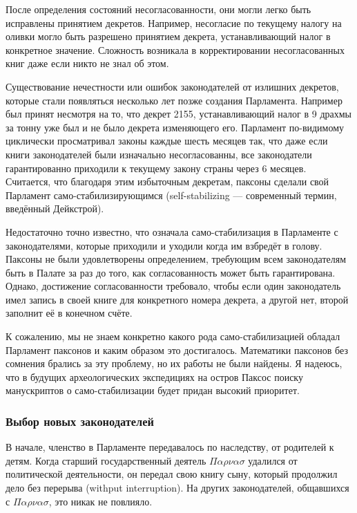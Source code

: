 \documentclass[12pt, a4paper]{article} %
\begin{document}
После определения состояний несогласованности, они могли легко быть исправлены принятием декретов. Например, несогласие по текущему налогу на оливки могло быть разрешено принятием декрета, устанавливающий налог в конкретное значение. Сложность возникала в корректировании несогласованных книг даже если никто не знал об этом. 

Существование нечестности или ошибок законодателей от излишних декретов, которые стали появляться несколько лет позже создания Парламента. Например
был принят несмотря на то, что декрет 2155, устанавливающий налог в 9 драхмы за тонну уже был и не было декрета изменяющего его. Парламент по-видимому циклически просматривал законы каждые шесть месяцев так, что даже если книги законодателей были изначально несогласованны, все законодатели гарантированно приходили к текущему закону страны через 6 месяцев. Считается, что благодаря этим избыточным декретам, паксоны сделали свой Парламент само-стабилизирующимся (self-stabilizing --- современный термин, введённый Дейкстрой).

Недостаточно точно известно, что означала само-стабилизация в Парламенте с законодателями, которые приходили и уходили когда им взбредёт в голову. Паксоны не были удовлетворены определением, требующим всем законодателям быть в Палате за раз до того, как согласованность может быть гарантирована. Однако, достижение согласованности требовало, чтобы если один законодатель имел запись в своей книге для конкретного номера декрета, а другой нет, второй заполнит её в конечном счёте.

К сожалению, мы не знаем конкретно какого рода само-стабили\-зацией обладал Парламент паксонов и каким образом это достигалось. Математики паксонов без сомнения брались за эту проблему, но их работы не были найдены. Я надеюсь, что в будущих археологических экспедициях на остров Паксос поиску манускриптов о само-стабилизации будет придан высокий приоритет.

\subsubsection{Выбор новых законодателей}\label{sec:choosinglegist}

В начале, членство в Парламенте передавалось по наследству, от родителей к детям. Когда старший государственный деятель $\Pi\alpha\rho\nu\alpha\sigma$ удалился от политической деятельности, он передал свою книгу сыну, который продолжил дело без перерыва (withput interruption). На других законодателей, общавшихся с $\Pi\alpha\rho\nu\alpha\sigma$, это никак не повлияло.
\end{document}

